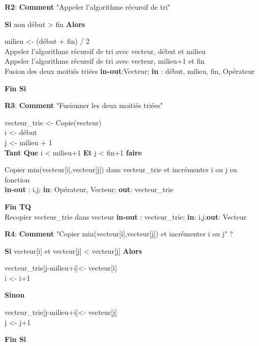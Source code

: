 \documentclass{NewTeXRaffinage}
\begin{document}
\textbf{R2}: \textbf{Comment} "Appeler l'algorithme récursif de tri"
\begin{addmargin}[5em]{0pt}
    \textbf{Si}  non début  > fin \textbf{Alors}
    \begin{addmargin}[3em]{0pt}
        milieu <- (début + fin) / 2 \\
        Appeler l'algorithme récursif de tri  avec vecteur, début et milieu \\
        Appeler l'algorithme récursif de tri  avec vecteur, milieu+1 et fin \\
        Fusion des deux moitiés triées 
        \hspace*{0pt}\hfill \textbf{in-out}:Vecteur; \textbf{in} : début, milieu, fin, Opérateur
    \end{addmargin}
    \textbf{Fin Si}
\end{addmargin}

\textbf{R3}: \textbf{Comment} "Fusionner les deux moitiés triées"
\begin{addmargin}[5em]{0pt}
    vecteur\_trie <- Copie(vecteur) \\
    i <- début \\
    j <- milieu + 1 \\
    \textbf{Tant Que} i < milieu+1  \textbf{Et}  j  < fin+1 \textbf{faire}
    \begin{addmargin}[3em]{0pt}
        Copier min(vecteur[i],vecteur[j]) dans vecteur\_trie et incrémenter i ou j en fonction \\
        \hspace*{0pt}\hfill \textbf{in-out} : i,j; \textbf{in}: Opérateur, Vecteur; \textbf{out}: vecteur\_trie
    \end{addmargin}
    \textbf{Fin TQ} \\
    Recopier vecteur\_trie dans vecteur
    \hspace*{0pt}\hfill \textbf{in-out} : vecteur\_trie; \textbf{in}: i,j;\textbf{out}: Vecteur
\end{addmargin}

\textbf{R4}: \textbf{Comment} "Copier min(vecteur[i],vecteur[j]) et incrémenter i ou j" ?
\begin{addmargin}[5em]{0pt}
    \textbf{Si} vecteur[i] et vecteur[j] < vecteur[j] \textbf{Alors}
    \begin{addmargin}[3em]{0pt}
        vecteur\_trie[j-milieu+i]<- vecteur[i] \\
        i <- i+1
    \end{addmargin}
    \textbf{Sinon}
    \begin{addmargin}[3em]{0pt}
        vecteur\_trie[j-milieu+i]<- vecteur[j] \\
        j <- j+1
    \end{addmargin}
    \textbf{Fin Si}
\end{addmargin}
\end{document}
